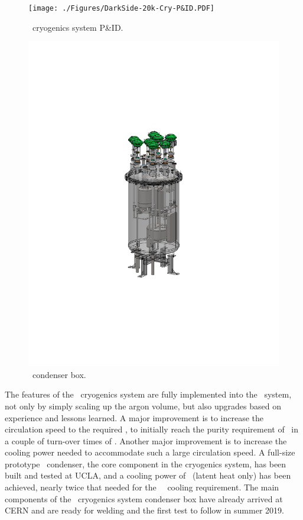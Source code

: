 \begin{figure}[!t]
\texttt{[image: ./Figures/DarkSide-20k-Cry-P\&ID.PDF]}
\caption[\DSks\ cryogenics system P\&ID]{\DSks\ cryogenics system P\&ID.}
\label{fig:DSCryo}
\end{figure}

\begin{figure}[!t]
\includegraphics[height=0.95\textheight]{./Figures/DSk-UArCryogenics.PDF}
\caption[\DSks\ condenser box]{\DSks\ condenser box.}
\label{fig:DSCondenser}
\end{figure}

The features of the \DSfs\ cryogenics system are fully implemented into the \DSks\ system, not only by simply scaling up the argon volume, but also upgrades based on experience and lessons learned.  A major improvement is to increase the circulation speed to the required \DSkCryogenicsGasFlowTotal, to initially reach the purity requirement of \LAr\ in a couple of turn-over times of \DSkUArTurnOverTime.  Another major improvement is to increase the cooling power needed to accommodate such a large circulation speed.  A full-size prototype \LAr\ condenser, the core component in the cryogenics system, has been built and tested at UCLA, and a cooling power of \DSkCryogenicsCondenserCoolingPowerMaxTested\ (latent heat only) has been achieved, nearly twice that needed for the \DSks\ \UAr\ cooling requirement.  The main components of the \UAr\ cryogenics system condenser box have already arrived at CERN and are ready for welding and the first test to follow in summer 2019.   

